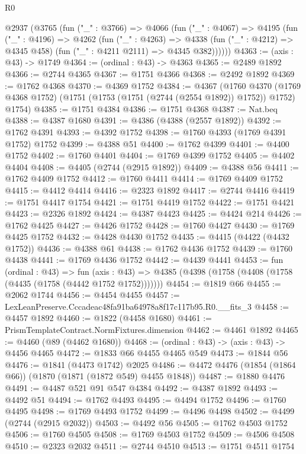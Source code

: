 \begin{lexlean}{R0}
\begin{coremodule}
  @2937
    (@3765
      (fun ("_" : @3766) =>
      @4066
        (fun ("_" : @4067) =>
        @4195
          (fun ("_" : @4196) =>
          @4262
            (fun ("_" : @4263) =>
            @4338 (fun ("_" : @4212) => @4345 @458) (fun ("_" : @4211 @2111) => @4345 @382))))))
@4363 := (axis : @43) -> @1749
@4364 := (ordinal : @43) -> @4363
@4365 := @2489 @1892
@4366 := @2744 @4365
@4367 := @1751 @4366
@4368 := @2492 @1892
@4369 := @1762 @4368
@4370 := @4369 @1752
@4384 := @4367
    (@1760
      @4370
      (@1769 @4368 @1752)
      (@1751 (@1753 (@1751 (@2744 (@2554 @1892)) @1752)) @1752)
      @1754)
@4385 := @1751 @4384
@4386 := @1751 @4368
@4387 := Nat.beq
@4388 := @4387 @1680
@4391 := @4386 (@4388 (@2557 @1892))
@4392 := @1762 @4391
@4393 := @4392 @1752
@4398 := @1760 @4393 (@1769 @4391 @1752) @1752
@4399 := @4388 @51
@4400 := @1762 @4399
@4401 := @4400 @1752
@4402 := @1760 @4401
@4404 := @1769 @4399 @1752
@4405 := @4402 @4404
@4408 := @4405 (@2744 (@2915 @1892))
@4409 := @4388 @56
@4411 := @1762 @4409 @1752
@4412 := @1760 @4411
@4414 := @1769 @4409 @1752
@4415 := @4412 @4414
@4416 := @2323 @1892
@4417 := @2744 @4416
@4419 := @1751 @4417 @1754
@4421 := @1751 @4419 @1752
@4422 := @1751 @4421
@4423 := @2326 @1892
@4424 := @4387 @4423
@4425 := @4424 @214
@4426 := @1762 @4425
@4427 := @4426 @1752
@4428 := @1760 @4427
@4430 := @1769 @4425 @1752
@4432 := @4428 @4430 @1752
@4435 := @4415 (@4422 (@4432 @1752))
@4436 := @4388 @61
@4438 := @1762 @4436 @1752
@4439 := @1760 @4438
@4441 := @1769 @4436 @1752
@4442 := @4439 @4441
@4453 := fun (ordinal : @43) =>
  fun (axis : @43) => @4385 (@4398 (@1758 (@4408 (@1758 (@4435 (@1758 (@4442 @1752 @1752)))))))
@4454 := @1819 @66
@4455 := @2062 @1744
@4456 := @4454 @4455
@4457 := LexLeanPreserve.Cccadeac48fa91ba64978a8f17c117b95.R0.__fits_3
@4458 := @4457 @1892
@4460 := @1822 (@4458 @1680)
@4461 := PrismTemplateContract.NormFixtures.dimension
@4462 := @4461 @1892
@4465 := @4460 (@89 (@4462 @1680))
@4468 := (ordinal : @43) -> (axis : @43) -> @4456 @4465
@4472 := @1833 @66 @4455 @4465 @549
@4473 := @1844 @56
@4476 := @1841 (@4473 @1742) @2025
@4486 := @4472 @4476 (@1854 (@1864 @66)) (@1870 (@1871 (@1872 @549) @4455 @1848))
@4487 := @1880 @4476
@4491 := @4487 @521 @91 @547 @4384
@4492 := @4387 @1892
@4493 := @4492 @51
@4494 := @1762 @4493
@4495 := @4494 @1752
@4496 := @1760 @4495
@4498 := @1769 @4493 @1752
@4499 := @4496 @4498
@4502 := @4499 (@2744 (@2915 @2032))
@4503 := @4492 @56
@4505 := @1762 @4503 @1752
@4506 := @1760 @4505
@4508 := @1769 @4503 @1752
@4509 := @4506 @4508
@4510 := @2323 @2032
@4511 := @2744 @4510
@4513 := @1751 @4511 @1754

\end{coremodule}
\end{lexlean}

